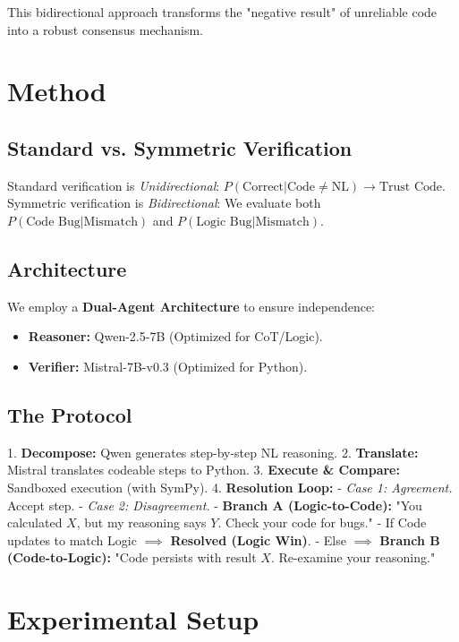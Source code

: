 \documentclass[11pt]{article}
\begin{document}
This bidirectional approach transforms the "negative result" of unreliable code into a robust consensus mechanism.

\section{Method}
\label{sec:method}

\subsection{Standard vs. Symmetric Verification}
Standard verification is \emph{Unidirectional}: $P(\text{Correct} | \text{Code} \neq \text{NL}) \rightarrow \text{Trust Code}$.
Symmetric verification is \emph{Bidirectional}: We evaluate both $P(\text{Code Bug} | \text{Mismatch})$ and $P(\text{Logic Bug} | \text{Mismatch})$.

\subsection{Architecture}
We employ a \textbf{Dual-Agent Architecture} to ensure independence:
\begin{itemize}
    \item \textbf{Reasoner:} Qwen-2.5-7B (Optimized for CoT/Logic).
    \item \textbf{Verifier:} Mistral-7B-v0.3 (Optimized for Python).
\end{itemize}

\subsection{The Protocol}
1. \textbf{Decompose:} Qwen generates step-by-step NL reasoning.
2. \textbf{Translate:} Mistral translates codeable steps to Python.
3. \textbf{Execute & Compare:} Sandboxed execution (with SymPy).
4. \textbf{Resolution Loop:}
   - \emph{Case 1: Agreement.} Accept step.
   - \emph{Case 2: Disagreement.}
     - \textbf{Branch A (Logic-to-Code):} "You calculated $X$, but my reasoning says $Y$. Check your code for bugs."
     - If Code updates to match Logic $\implies$ \textbf{Resolved (Logic Win)}.
     - Else $\implies$ \textbf{Branch B (Code-to-Logic):} "Code persists with result $X$. Re-examine your reasoning."

\section{Experimental Setup}
\label{sec:setup}
\end{document}
